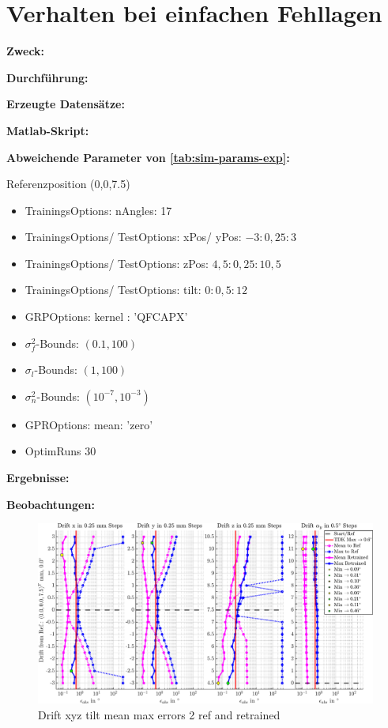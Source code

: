 %

\section{Verhalten bei einfachen Fehllagen}\label{sec:exp5}

\textbf{Zweck:}

\textbf{Durchführung:}

\textbf{Erzeugte Datensätze:}

\textbf{Matlab-Skript:}

\textbf{Abweichende Parameter von \autoref{tab:sim-params-exp}:}

Referenzposition (0,0,7.5)

\begin{itemize}
	\item TrainingsOptions: nAngles: 17
	\item TrainingsOptions/ TestOptions: xPos/ yPos: $-3:0,25:3$
	\item TrainingsOptions/ TestOptions: zPos: $4,5:0,25:10,5$
	\item TrainingsOptions/ TestOptions: tilt: $0:0,5:12$
	\item GRPOptions: kernel : 'QFCAPX'
	\item $\sigma_f^2$-Bounds: $(0.1,100)$
	\item $\sigma_l$-Bounds: $(1,100)$
	\item $\sigma_n^2$-Bounds: $(10^{-7},10^{-3})$
	\item GPROptions: mean: 'zero'
	\item OptimRuns 30
\end{itemize}


\textbf{Ergebnisse:}

\textbf{Beobachtungen:}

\clearpage
\begin{landscape}
\begin{figure}[tbph]
	\centering
	\includegraphics[width=\linewidth]{chapters/images/4-EuOExp/Drift-Model-Errors}
	\caption[Drift xyz tilt mean max errors 2 ref and retrained]{Drift xyz tilt mean max errors 2 ref and retrained}
	\label{fig:drift-model-errors}
\end{figure}
\end{landscape}


